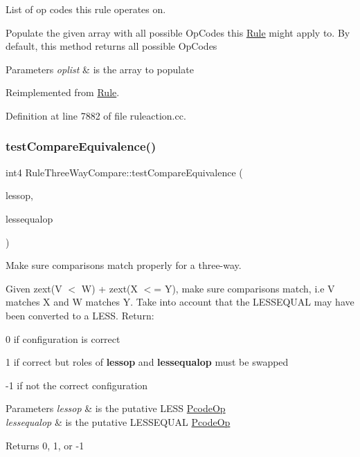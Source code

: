 List of op codes this rule operates on. 

Populate the given array with all possible Op\+Codes this \mbox{\hyperlink{class_rule}{Rule}} might apply to. By default, this method returns all possible Op\+Codes 
\begin{DoxyParams}{Parameters}
{\em oplist} & is the array to populate \\
\hline
\end{DoxyParams}


Reimplemented from \mbox{\hyperlink{class_rule_a4023bfc7825de0ab866790551856d10e}{Rule}}.



Definition at line 7882 of file ruleaction.\+cc.

\mbox{\label{class_rule_three_way_compare_a247d3ecba480bc52cf0240e5932c5e6f}} 
\subsubsection{\texorpdfstring{testCompareEquivalence()}{testCompareEquivalence()}}
{\footnotesize\ttfamily int4 Rule\+Three\+Way\+Compare\+::test\+Compare\+Equivalence (\begin{DoxyParamCaption}\item[{\mbox{\hyperlink{class_pcode_op}{Pcode\+Op}} $\ast$}]{lessop,  }\item[{\mbox{\hyperlink{class_pcode_op}{Pcode\+Op}} $\ast$}]{lessequalop }\end{DoxyParamCaption})\hspace{0.3cm}{\ttfamily [static]}}



Make sure comparisons match properly for a three-\/way. 

Given {\ttfamily zext(V $<$ W) + zext(X $<$= Y)}, make sure comparisons match, i.\+e V matches X and W matches Y. Take into account that the L\+E\+S\+S\+E\+Q\+U\+AL may have been converted to a L\+E\+SS. Return\+:
\begin{DoxyItemize}
\item 0 if configuration is correct
\item 1 if correct but roles of {\bfseries{lessop}} and {\bfseries{lessequalop}} must be swapped
\item -\/1 if not the correct configuration 
\begin{DoxyParams}{Parameters}
{\em lessop} & is the putative L\+E\+SS \mbox{\hyperlink{class_pcode_op}{Pcode\+Op}} \\
\hline
{\em lessequalop} & is the putative L\+E\+S\+S\+E\+Q\+U\+AL \mbox{\hyperlink{class_pcode_op}{Pcode\+Op}} \\
\hline
\end{DoxyParams}
\begin{DoxyReturn}{Returns}
0, 1, or -\/1 
\end{DoxyReturn}

\end{DoxyItemize}

